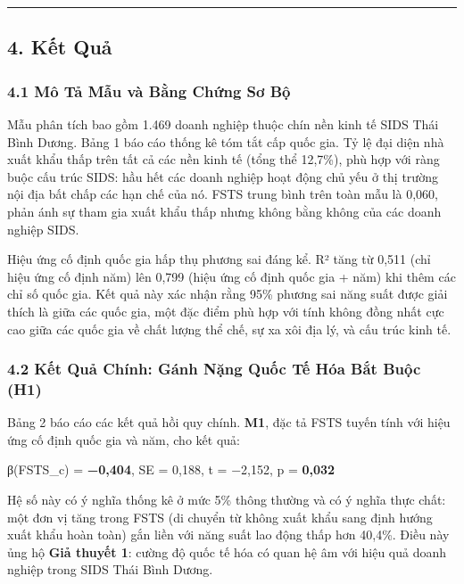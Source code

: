 \documentclass[12pt,a4paper]{article}
\begin{document}
\begin{center}\rule{0.5\linewidth}{0.5pt}\end{center}

\hypertarget{4-kux1ebft-quux1ea3}{%
\subsection{4. Kết Quả}\label{4-kux1ebft-quux1ea3}}

\hypertarget{41-muxf4-tux1ea3-mux1eabu-vuxe0-bux1eb1ng-chux1ee9ng-sux1a1-bux1ed9}{%
\subsubsection{4.1 Mô Tả Mẫu và Bằng Chứng Sơ
Bộ}\label{41-muxf4-tux1ea3-mux1eabu-vuxe0-bux1eb1ng-chux1ee9ng-sux1a1-bux1ed9}}

Mẫu phân tích bao gồm 1.469 doanh nghiệp thuộc chín nền kinh tế SIDS
Thái Bình Dương. Bảng 1 báo cáo thống kê tóm tắt cấp quốc gia. Tỷ lệ đại
diện nhà xuất khẩu thấp trên tất cả các nền kinh tế (tổng thể 12,7\%),
phù hợp với ràng buộc cấu trúc SIDS: hầu hết các doanh nghiệp hoạt động
chủ yếu ở thị trường nội địa bất chấp các hạn chế của nó. FSTS trung
bình trên toàn mẫu là 0,060, phản ánh sự tham gia xuất khẩu thấp nhưng
không bằng không của các doanh nghiệp SIDS.

Hiệu ứng cố định quốc gia hấp thụ phương sai đáng kể. R² tăng từ 0,511
(chỉ hiệu ứng cố định năm) lên 0,799 (hiệu ứng cố định quốc gia + năm)
khi thêm các chỉ số quốc gia. Kết quả này xác nhận rằng 95\% phương sai
năng suất được giải thích là giữa các quốc gia, một đặc điểm phù hợp với
tính không đồng nhất cực cao giữa các quốc gia về chất lượng thể chế, sự
xa xôi địa lý, và cấu trúc kinh tế.

\hypertarget{42-kux1ebft-quux1ea3-chuxednh-guxe1nh-nux1eb7ng-quux1ed1c-tux1ebf-huxf3a-bux1eaft-buux1ed9c-h1}{%
\subsubsection{4.2 Kết Quả Chính: Gánh Nặng Quốc Tế Hóa Bắt Buộc
(H1)}\label{42-kux1ebft-quux1ea3-chuxednh-guxe1nh-nux1eb7ng-quux1ed1c-tux1ebf-huxf3a-bux1eaft-buux1ed9c-h1}}

Bảng 2 báo cáo các kết quả hồi quy chính. \textbf{M1}, đặc tả FSTS tuyến
tính với hiệu ứng cố định quốc gia và năm, cho kết quả:

β(FSTS\_c) = \textbf{−0,404}, SE = 0,188, t = −2,152, p = \textbf{0,032}

Hệ số này có ý nghĩa thống kê ở mức 5\% thông thường và có ý nghĩa thực
chất: một đơn vị tăng trong FSTS (di chuyển từ không xuất khẩu sang định
hướng xuất khẩu hoàn toàn) gắn liền với năng suất lao động thấp hơn
40,4\%. Điều này ủng hộ \textbf{Giả thuyết 1}: cường độ quốc tế hóa có
quan hệ âm với hiệu quả doanh nghiệp trong SIDS Thái Bình Dương.
\end{document}
